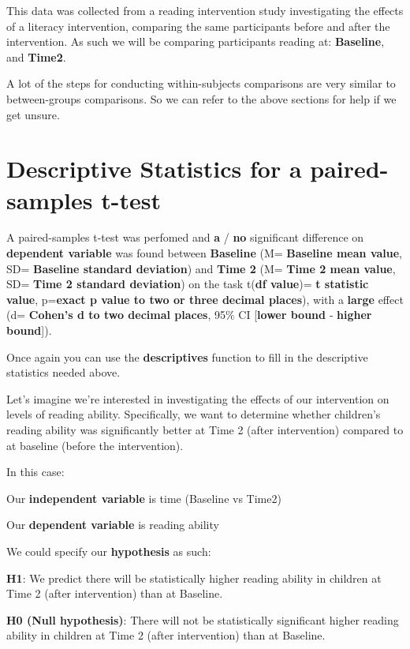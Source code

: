 \documentclass[
]{book}
\begin{document}
This data was collected from a reading intervention study investigating the effects of a literacy intervention, comparing the same participants before and after the intervention. As such we will be comparing participants reading at: \textbf{Baseline}, and \textbf{Time2}.

A lot of the steps for conducting within-subjects comparisons are very similar to between-groups comparisons. So we can refer to the above sections for help if we get unsure.

\section{Descriptive Statistics for a paired-samples t-test}\label{descriptive-statistics-for-a-paired-samples-t-test}

A paired-samples t-test was perfomed and \textbf{a} / \textbf{no} significant difference on \textbf{dependent variable} was found between \textbf{Baseline} (M= \textbf{Baseline mean value}, SD= \textbf{Baseline standard deviation}) and \textbf{Time 2} (M= \textbf{Time 2 mean value}, SD= \textbf{Time 2 standard deviation}) on the task t(\textbf{df value})= \textbf{t statistic value}, p=\textbf{exact p value to two or three decimal places}), with a \textbf{large} effect (d= \textbf{Cohen's d to two decimal places}, 95\% CI {[}\textbf{lower bound} ‐ \textbf{higher bound}{]}).

Once again you can use the \textbf{descriptives} function to fill in the descriptive statistics needed above.

Let's imagine we're interested in investigating the effects of our intervention on levels of reading ability. Specifically, we want to determine whether children's reading ability was significantly better at Time 2 (after intervention) compared to at baseline (before the intervention).

In this case:

Our \textbf{independent variable} is time (Baseline vs Time2)

Our \textbf{dependent variable} is reading ability

We could specify our \textbf{hypothesis} as such:

\textbf{H1}: We predict there will be statistically higher reading ability in children at Time 2 (after intervention) than at Baseline.

\textbf{H0 (Null hypothesis)}: There will not be statistically significant higher reading ability in children at Time 2 (after intervention) than at Baseline.
\end{document}
